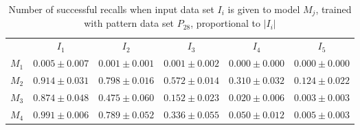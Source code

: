 \documentclass[anon]{CI}
\begin{document}
		\begin{table}[H]
			\centering
			\def\arraystretch{1.5}
			\footnotesize
			\begin{tabular}{cccccc}
				
				& $I_{1}$  & $I_{2}$  & $I_{3}$  & $I_{4}$  & $I_{5}$ \\ \cline{2-6}
				$M_{1}$  & $0.005\pm0.007$  & $0.001\pm0.001$  & $0.001\pm0.002$  & $0.000\pm0.000$  & $0.000\pm0.000$ \\
				$M_{2}$  & $0.914\pm0.031$  & $0.798\pm0.016$  & $0.572\pm0.014$  & $0.310\pm0.032$  & $0.124\pm0.022$ \\
				$M_{3}$  & $0.874\pm0.048$  & $0.475\pm0.060$  & $0.152\pm0.023$  & $0.020\pm0.006$  & $0.003\pm0.003$ \\
				$M_{4}$  & $0.991\pm0.006$  & $0.789\pm0.052$  & $0.336\pm0.055$  & $0.050\pm0.012$  & $0.005\pm0.003$ \\
				
			\end{tabular}
			\caption{Number of successful recalls when input data set $I_i$ is given to model $M_j$, trained with pattern data set $P_{28}$, proportional to $\left|I_i\right|$}
		\end{table}
\end{document}
